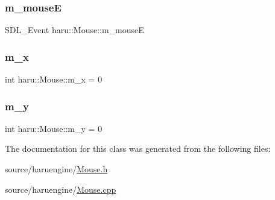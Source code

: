 \subsubsection{\texorpdfstring{m\+\_\+mouseE}{m\_mouseE}}
{\footnotesize\ttfamily S\+D\+L\+\_\+\+Event haru\+::\+Mouse\+::m\+\_\+mouseE}

\mbox{\label{classharu_1_1_mouse_a554f48ffbcb1216e483066ab8f941722}} 
\subsubsection{\texorpdfstring{m\+\_\+x}{m\_x}}
{\footnotesize\ttfamily int haru\+::\+Mouse\+::m\+\_\+x = 0}

\mbox{\label{classharu_1_1_mouse_a7045facf4879e12902aeb852a894327f}} 
\subsubsection{\texorpdfstring{m\+\_\+y}{m\_y}}
{\footnotesize\ttfamily int haru\+::\+Mouse\+::m\+\_\+y = 0}



The documentation for this class was generated from the following files\+:\begin{DoxyCompactItemize}
\item 
source/haruengine/\mbox{\hyperlink{_mouse_8h}{Mouse.\+h}}\item 
source/haruengine/\mbox{\hyperlink{_mouse_8cpp}{Mouse.\+cpp}}\end{DoxyCompactItemize}
